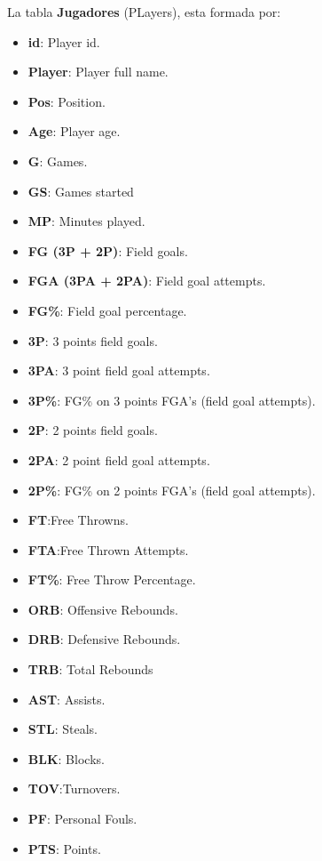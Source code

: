 \documentclass[11pt]{diazessay} %
\begin{document}
La tabla \textbf{Jugadores} (PLayers), esta formada por:
\begin{itemize}
	\item \textbf{id}: Player id.
	\item \textbf{Player}: Player full name.
	\item \textbf{Pos}: Position.
	\item \textbf{Age}: Player age.
	\item \textbf{G}: Games.
	\item \textbf{GS}: Games started
	\item \textbf{MP}: Minutes played.
	\item \textbf{FG (3P + 2P)}: Field goals.
	\item \textbf{FGA (3PA + 2PA)}: Field goal attempts.
	\item \textbf{FG\%}: Field goal percentage.
	\item \textbf{3P}: 3 points field goals.
	\item \textbf{3PA}: 3 point field goal attempts.
	\item \textbf{3P\%}: FG\% on 3 points FGA's (field goal attempts).
	\item \textbf{2P}: 2 points field goals.	
	\item \textbf{2PA}: 2 point field goal attempts.
	\item \textbf{2P\%}: FG\% on 2 points FGA's (field goal attempts).
	\item \textbf{FT}:Free Throwns.
	\item \textbf{FTA}:Free Thrown Attempts.
	\item \textbf{FT\%}: Free Throw Percentage.
	\item\textbf{ORB}: Offensive Rebounds.
	\item\textbf{DRB}: Defensive Rebounds.
	\item\textbf{TRB}: Total Rebounds
	\item\textbf{AST}: Assists.
	\item\textbf{STL}: Steals.
	\item\textbf{BLK}: Blocks.
	\item\textbf{TOV}:Turnovers.
	\item\textbf{PF}: Personal Fouls.
	\item\textbf{PTS}: Points.
\end{itemize}
\end{document}
